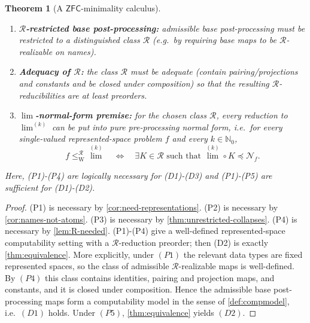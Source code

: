 \documentclass{lmcs} %
\theoremstyle{plain}
\theoremstyle{plain}
\newtheorem{theorem}{Theorem}[section]
\theoremstyle{definition}
\theoremstyle{remark}
\theoremstyle{definition}
\theoremstyle{remark}
\numberwithin{equation}{section}
\newcommand{\Lim}{\operatorname{lim}}
\newcommand{\Limi}[1]{\Lim^{(#1)}}
\begin{document}
\begin{theorem}[A $\mathsf{ZFC}$-minimality calculus]
\begin{enumerate}
\item[(P3)] \textbf{$\mathcal R$-restricted base post-processing:}
admissible base post-processing must be restricted to a distinguished class $\mathcal R$
(e.g.\ by requiring base maps to be $\mathcal R$-realizable on names).

\item[(P4)] \textbf{Adequacy of $\mathcal R$:}
the class $\mathcal R$ must be adequate (contain pairing/projections and constants and be closed
under composition) so that the resulting $\mathcal R$-reducibilities are at least preorders.

\item[(P5)] \textbf{$\Lim$-normal-form premise:}
for the chosen class $\mathcal R$, every reduction to $\Limi{k}$
can be put into pure pre-processing normal form, i.e.\
for every single-valued represented-space problem $f$ and every
$k\in\mathbb N_0$,
\[
f \le_{\mathrm W}^{\mathcal R} \Limi{k}
\quad\Longleftrightarrow\quad
\exists K\in\mathcal R \text{ such that } \Limi{k} \circ K \preceq \mathcal N_f.
\]
\end{enumerate}
Here, (P1)-(P4) are logically necessary for (D1)-(D3) and (P1)-(P5) are sufficient for (D1)-(D2).
\end{theorem}

\begin{proof}
(P1) is necessary by \cref{cor:need-representations}.
(P2) is necessary by \cref{cor:names-not-atoms}.
(P3) is necessary by \cref{thm:unrestricted-collapses}.
(P4) is necessary by \cref{lem:R-needed}.
(P1)-(P4) give a well-defined represented-space computability setting with a
$\mathcal R$-reduction preorder; then (D2) is exactly \cref{thm:equivalence}. 
More explicitly, under $(P1)$ the relevant data types are fixed represented spaces, so the
class of admissible $\mathcal R$-realizable maps is well-defined. By $(P4)$ this class contains
identities, pairing and projection maps, and constants, and it is closed under composition.
Hence the admissible base post-processing maps form a computability model in the sense
of \cref{def:compmodel}, i.e.\ $(D1)$ holds. Under $(P5)$, \cref{thm:equivalence} yields $(D2)$.
\end{proof}
\end{document}
